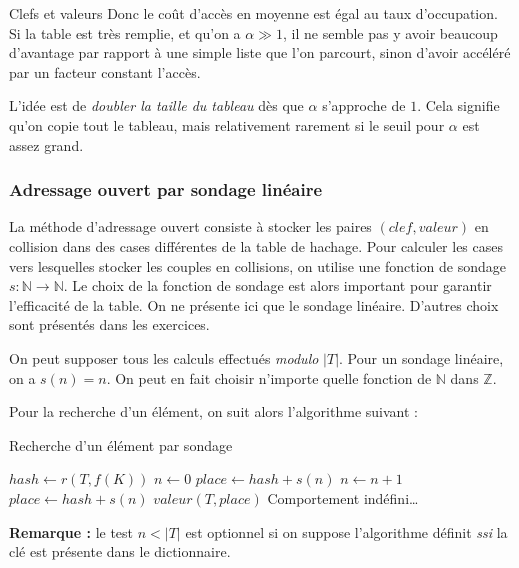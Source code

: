 \documentclass[../../../main.tex]{subfiles}
\begin{document}
\begin{definition}{Clefs et valeurs}
Donc le coût d'accès en moyenne est égal au taux d'occupation. Si la table est très remplie, et qu'on a $\alpha \gg 1$, il ne semble pas y avoir beaucoup d'avantage par rapport à une simple liste que l'on parcourt, sinon d'avoir accéléré par un facteur constant l'accès.

L'idée est de \textit{doubler la taille du tableau} dès que $\alpha$ s'approche de $1$. Cela signifie qu'on copie tout le tableau, mais relativement rarement si le seuil pour $\alpha$ est assez grand.
\subsubsection{Adressage ouvert par sondage linéaire}
La méthode d'adressage ouvert consiste à stocker les paires $(clef, valeur)$ en collision dans des cases différentes de la table de hachage. Pour calculer les cases vers lesquelles stocker les couples en collisions, on utilise une fonction de sondage $s:\mathbb{N}\rightarrow \mathbb{N}$. Le choix de la fonction de sondage est alors important pour garantir l'efficacité de la table. On ne présente ici que le sondage linéaire. D'autres choix sont présentés dans les exercices.

\begin{minipage}{\textwidth}
	\begin{center}
		
	\end{center}
\end{minipage}

On peut supposer tous les calculs effectués \textit{modulo} $|T|$. Pour un sondage linéaire, on a $s(n) = n$. On peut en fait choisir n'importe quelle fonction de $\mathbb{N}$ dans $\mathbb{Z}$.

Pour la recherche d'un élément, on suit alors l'algorithme suivant :\newline

\begin{algorithm}
\caption{Recherche d'un élément par sondage}\label{alg:dict_sondage}
$hash \leftarrow r(T, f(K))$\;
$n \leftarrow 0$\;
$place \leftarrow hash + s(n)$\;
 {
	$n\leftarrow n + 1$\;
	$place\leftarrow hash + s(n)$\;
}
 {
	\Return $valeur(T, place)$\;
} {
	Comportement indéfini\dots {}
}
\end{algorithm}

\textbf{Remarque :} le test $n < |T|$ est optionnel si on suppose l'algorithme définit \textit{ssi} la clé est présente dans le dictionnaire.


\end{definition}
\end{document}
